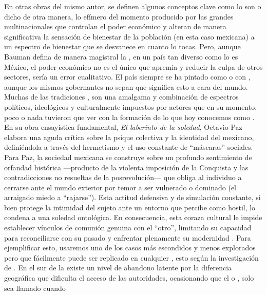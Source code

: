 En otras obras del mismo autor, se definen algunos conceptos clave como lo son  o dicho de otra
manera, lo efímero del momento producido por las grandes multinacionales que controlan el poder económico y alteran de manera
significativa la sensación de bienestar de la población (en esta caso mexicana) a un espectro de bienestar que se
desvanece en cuanto lo tocas. Pero, aunque Bauman defina de manera magistral la , en un
país tan diverso como lo es México, el poder económico no es el único que apremia y reducir la culpa de otros sectores,
sería un error cualitativo. El país siempre se ha pintado como  o con ,
aunque los mismos gobernantes no sepan que significa esto a cara del mundo. Muchas de las tradiciones ,
son una amalgama y combinación de espectros políticos, ideológicos y culturalmente impuestos por actores que en su momento,
poco o nada tuvieron que ver con la formación de lo que hoy conocemos como . En su obra ensayística fundamental,
\textit{El laberinto de la soledad}, Octavio Paz elabora una aguda crítica sobre la psique colectiva y la
identidad del mexicano, definiéndola a través del hermetismo y el uso constante de ``máscaras'' sociales.
Para Paz, la sociedad mexicana se construye sobre un profundo sentimiento de orfandad histórica ---producto de la violenta
imposición de la Conquista y las contradicciones no resueltas de la posrevolución--- que obliga al individuo a cerrarse
ante el mundo exterior por temor a ser vulnerado o dominado (el arraigado miedo a ``rajarse''). Esta actitud defensiva y
de simulación constante, si bien protege la intimidad del sujeto ante un entorno que percibe como hostil, lo condena a
una soledad ontológica. En consecuencia, esta coraza cultural le impide establecer vínculos de comunión genuina con
el ``otro'', limitando su capacidad para reconciliarse con su pasado y enfrentar plenamente su modernidad
\cite{paz1959laberinto}. Para ejemplificar esto, usaremos uno de los casos más escondidos y menos explorados pero que
fácilmente puede ser replicado en cualquier , esto según la investigación de
\cite{lopezcaballero2017indigenas}. En el sur de la \zmvm existe un nivel de abandono latente por la diferencia geográfica
que dificulta el acceso de las autoridades, ocasionando que el  o , solo sea llamado cuando
